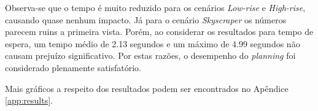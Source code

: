 Observa-se que o tempo é muito reduzido para os cenários \textit{Low-rise} e
\textit{High-rise}, causando quase nenhum impacto. Já para o cenário
\textit{Skyscraper} os números parecem ruins a primeira vista. Porém, ao
considerar os resultados para tempo de espera, um tempo médio de 2.13 segundos e
um máximo de 4.99 segundos não causam prejuízo significativo. Por estas razões,
o desempenho do \textit{planning} foi considerado plenamente satisfatório.

Mais gráficos a respeito dos resultados podem ser encontrados no Apêndice
\ref{app:results}.
